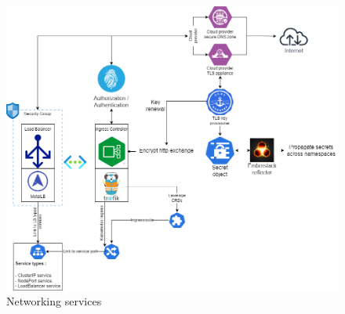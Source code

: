 \begin{figure}[H]\centering
\includegraphics[width=1.0\textwidth,angle=00]{assets/f22.png}
\caption{ Networking services}
\label{fig:Networking services}
\end{figure}

